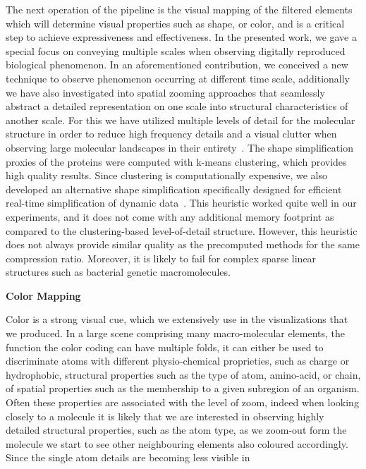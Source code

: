 The next operation of the pipeline is the visual mapping of the filtered elements which will determine visual properties such as shape, or color, and is a critical step to achieve expressiveness and effectiveness.
In the presented work, we gave a special focus on conveying multiple scales when observing digitally reproduced biological phenomenon. 
In an aforementioned contribution, we conceived a new technique to observe phenomenon occurring at different time scale, additionally we have also investigated into spatial zooming approaches that seamlessly abstract a detailed representation on one scale into structural characteristics of another scale.
For this we have utilized multiple levels of detail for the molecular structure in order to reduce high frequency details and a visual clutter when observing large molecular landscapes in their entirety~\cite{cellView}. 
The shape simplification proxies of the proteins were computed with k-means clustering, which provides high quality results.
Since clustering is computationally expensive, we also developed an alternative shape simplification specifically designed for efficient real-time simplification of dynamic data~\cite{le2014illustrative}.
This heuristic worked quite well in our experiments, and it does not come with any additional memory footprint as compared to the clustering-based level-of-detail structure. 
However, this heuristic does not always provide similar quality as the precomputed methods for the same compression ratio.
Moreover, it is likely to fail for complex sparse linear structures such as bacterial genetic macromolecules.


\textbf{Color Mapping}

Color is a strong visual cue, which we extensively use in the visualizations that we produced.
In a large scene comprising many macro-molecular elements, the function the color coding can have multiple folds, it can either be used to discriminate atoms with different physio-chemical proprieties, such as charge or hydrophobic, structural properties such as the type of atom, amino-acid, or chain, of spatial properties such as the membership to a given subregion of an organism.
Often these properties are associated with the level of zoom, indeed when looking closely to a molecule it is likely that we are interested in observing highly detailed structural properties, such as the atom type, as we zoom-out form the molecule we start to see other neighbouring elements also coloured accordingly. 
Since the single atom details are becoming less visible in

